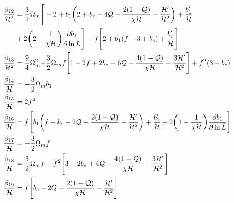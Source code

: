 \begin{align}
\frac{\beta_{12}}{\mathcal{H}^{2}} &= \frac{3}{2}\Omega_{m}\Bigg[-2+b_{1}\bigg(2+b_{e}-4\mathcal{Q}-\frac{2(1-\mathcal{Q})}{\chi\mathcal{H}} -\frac{\mathcal{H}'}{\mathcal{H}^{2}}\bigg) + \frac{b_{1}'}{\mathcal{H}} \nonumber \\
&+ 2\bigg(2-\frac{1}{\chi\mathcal{H}}\bigg)\frac{\partial b_{1}}{\partial \ln{\bar{L}}}\Bigg]- f\Bigg[2+b_{1}(f-3+b_{e}) + \frac{b_{1}'}{\mathcal{H}}\Bigg]  \\ 
\frac{\beta_{13}}{\mathcal{H}^{2}} &= \frac{9}{4}\Omega_{m}^{2} {+ \frac{3}{2}\Omega_{m}f\Bigg[1-2f+2b_{e}-{6}\mathcal{Q}-\frac{4(1-\mathcal{Q})}{\chi\mathcal{H}}-\frac{3\mathcal{H}'}{\mathcal{H}^{2}}\Bigg]} + f^{2}(3-b_{e}) \\ 
\frac{\beta_{14}}{\mathcal{H}} &= -\frac{3}{2}\Omega_{m}b_{1} \\
\frac{\beta_{15}}{\mathcal{H}} &= 2f^{2}  \\ 
\frac{\beta_{16}}{\mathcal{H}} &= f\Bigg[b_{1}\bigg(f+b_{e}-2\mathcal{Q}-\frac{2(1-\mathcal{Q})}{\chi\mathcal{H}}-\frac{\mathcal{H}'}{\mathcal{H}^{2}}\bigg) + \frac{b_{1}'}{\mathcal{H}} + 2\bigg(1-\frac{1}{\chi\mathcal{H}}\bigg)\frac{\partial b_{1}}{\partial \ln \bar{L}}\Bigg] \\
\frac{\beta_{17}}{\mathcal{H}} &= -\frac{3}{2}\Omega_{m}f \\
\frac{\beta_{18}}{\mathcal{H}} &= \frac{3}{2}\Omega_{m}f -f^{2}\Bigg[3-2b_{e}+{4}\mathcal{Q}+\frac{4(1-\mathcal{Q})}{\chi\mathcal{H}}+\frac{3\mathcal{H}'}{\mathcal{H}^{2}}\Bigg] \\
\frac{\beta_{19}}{\mathcal{H}} &= f\Bigg[b_{e}-2Q-\frac{2(1-\mathcal{Q})}{\chi\mathcal{H}}-\frac{\mathcal{H}'}{\mathcal{H}^{2}}\Bigg] 
\end{align}